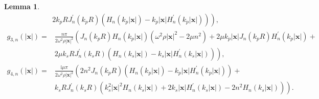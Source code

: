 \documentclass[10pt,reqno,oneside]{amsart}%
\newtheorem{lem}{Lemma}[section]
\theoremstyle{definition}
\theoremstyle{remark}
\numberwithin{equation}{section}
\numberwithin{equation}{section}
\begin{document}
\begin{lem}
\begin{equation}
\begin{aligned}
& \left.2 k_{p}R J_{n}^{\prime}\left(k_{p} R\right)\left(H_{n}\left(k_{p}|\mathbf{x}|\right)-k_{p} |\mathbf{x}| H_{n}^{\prime}\left(k_{p}|\mathbf{x}|\right)\right)\right),\nonumber
\end{aligned}
\end{equation}
\begin{equation}
\begin{aligned}
g_{3, n}(|\mathbf{x}|)= & \frac{n \pi}{2 \omega^{2} \rho |\mathbf{x}|^{2}}\left(J_{n}\left(k_{p} R\right) H_{n}\left(k_{p}|\mathbf{x}|\right)\left(\omega^{2} \rho |\mathbf{x}|^{2}-2 \mu n^{2}\right)+2 \mu k_{p}|\mathbf{x}| J_{n}\left(k_{p} R\right) H_{n}^{\prime}\left(k_{p}|\mathbf{x}|\right)+\right. \\
& \left.2 \mu k_{s}R J_{n}^{\prime}\left(k_{s} R\right)\left(H_{n}\left(k_{s}|\mathbf{x}|\right)-k_{s} |\mathbf{x}| H_{n}^{\prime}\left(k_{s}|\mathbf{x}|\right)\right)\right),\nonumber
\end{aligned}
\end{equation}
\begin{equation}
\begin{aligned}
g_{4, n}(|\mathbf{x}|)= & \frac{\mathrm{i} \mu \pi}{2 \omega^{2} \rho |\mathbf{x}|^{2}}\left(2 n^{2} J_{n}\left(k_{p} R\right)\left(H_{n}\left(k_{p}|\mathbf{x}|\right)-k_{p} |\mathbf{x}| H_{n}^{\prime}\left(k_{p}|\mathbf{x}|\right)\right)+\right. \\
&\left. k_{s} R J_{n}^{\prime}\left(k_{s} R\right) \left(k_{s}^{2} |\mathbf{x}|^{2} H_{n}\left(k_{s}|\mathbf{x}|\right)+2 k_{s} |\mathbf{x}| H_{n}^{\prime}\left(k_{s}|\mathbf{x}|\right)-2 n^{2} H_{n}\left(k_{s}|\mathbf{x}|\right)\right)\right).\nonumber
\end{aligned}
\end{equation}
\end{lem}%
\end{document}
